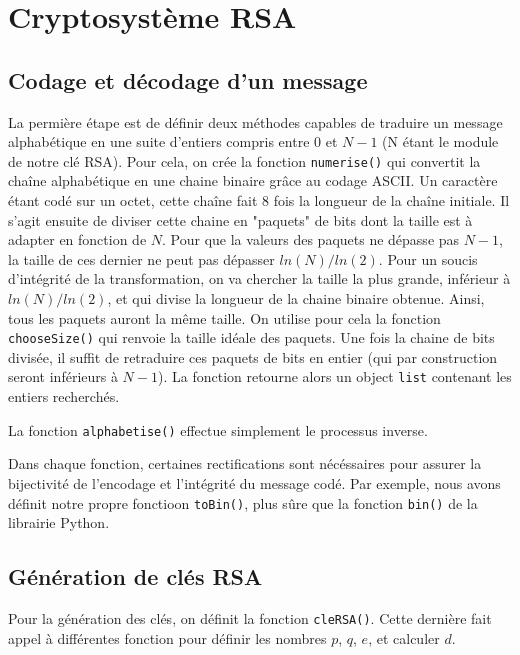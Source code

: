 \documentclass[titlepage]{article}
\begin{document}
    \section{Cryptosystème RSA}
    \subsection{Codage et décodage d'un message}
    La permière étape est de définir deux méthodes capables de traduire un message alphabétique en une suite d'entiers compris entre $0$ et $N-1$ (N étant le module de notre clé RSA).
    Pour cela, on crée la fonction \texttt{numerise()} qui convertit la chaîne alphabétique en une chaine binaire grâce au codage ASCII. Un caractère étant codé sur un octet, cette chaîne fait 8 fois la longueur de la chaîne initiale.
    Il s'agit ensuite de diviser cette chaine en "paquets" de bits dont la taille est à adapter en fonction de $N$.
    Pour que la valeurs des paquets ne dépasse pas $N-1$, la taille de ces dernier ne peut pas dépasser $ln(N)/ln(2)$. Pour un soucis d'intégrité de la transformation, on va chercher la taille la plus grande, inférieur à $ln(N)/ln(2)$, et qui divise la longueur de la chaine binaire obtenue.
    Ainsi, tous les paquets auront la même taille. On utilise pour cela la fonction \texttt{chooseSize()} qui renvoie la taille idéale des paquets.
    Une fois la chaine de bits divisée, il suffit de retraduire ces paquets de bits en entier (qui par construction seront inférieurs à $N-1$).
    La fonction retourne alors un object \texttt{list} contenant les entiers recherchés.

    

    La fonction \texttt{alphabetise()} effectue simplement le processus inverse.
    
    

    Dans chaque fonction, certaines rectifications sont nécéssaires pour assurer la bijectivité de l'encodage et l'intégrité du message codé. Par exemple, nous avons définit notre propre fonctioon \texttt{toBin()}, plus sûre que la fonction \texttt{bin()} de la librairie Python. 

    \subsection{Génération de clés RSA}
    Pour la génération des clés, on définit la fonction \texttt{cleRSA()}. Cette dernière fait appel à différentes fonction pour définir les nombres $p$, $q$, $e$, et calculer $d$.
\end{document}
